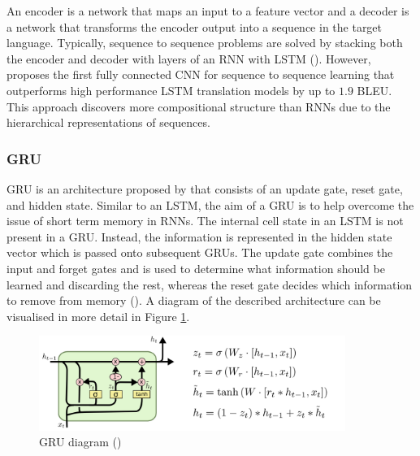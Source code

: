 
An encoder is a network that maps an input to a feature vector and a decoder is a network that transforms the encoder output into a sequence in the target language. Typically, sequence to sequence problems are solved by stacking both the encoder and decoder with layers of an RNN with \acrshort{LSTM} (\cite{luong_effective_2015}). However, \cite{gehring_convolutional_2017} proposes the first fully connected \acrshort{CNN} for sequence to sequence learning that outperforms high performance \acrshort{LSTM} translation models by up to $1.9$ \acrshort{BLEU}. This approach discovers more compositional structure than \acrshort{RNN}s due to the hierarchical representations of sequences.

\subsubsection{\acrlong{GRU}}


\acrfull{GRU} is an architecture proposed by \cite{cho_properties_2014} that consists of an update gate, reset gate, and hidden state. Similar to an \acrshort{LSTM}, the aim of a \acrshort{GRU} is to help overcome the issue of short term memory in \acrshort{RNN}s.
The internal cell state in an \acrshort{LSTM} is not present in a \acrshort{GRU}. Instead, the information is represented in the hidden state vector which is passed onto subsequent \acrshort{GRU}s.
The update gate combines the input and forget gates and is used to determine what information should be learned and discarding the rest, whereas the reset gate decides which information to remove from memory (\cite{gao_gru_2016}).
A diagram of the described architecture can be visualised in more detail in Figure \ref{fig:rnn_gru}.
\begin{figure}[ht!]
\centering
\includegraphics[width=0.89\textwidth]{media/literature/machine_learning/ml_rnn_gru.png}
\caption[Diagram of Gated Recurrent Unit]{\acrfull{GRU} diagram (\cite{colah_lstm_2019})}
\label{fig:rnn_gru}
\end{figure}


